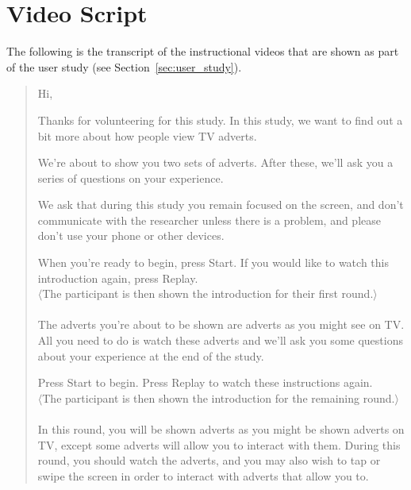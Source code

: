 \section{Video Script}
\label{sec:appendix_video_script}

The following is the transcript of the instructional videos that are shown as part of the user study (see Section~\ref{sec:user_study}).

\begin{quotation}
	\noindent Hi,

	Thanks for volunteering for this study. In this study, we want to find out a bit more about how people view TV adverts. 

	We're about to show you two sets of adverts. After these, we'll ask you a series of questions on your experience.

	We ask that during this study you remain focused on the screen, and don’t communicate with the researcher unless there is a problem, and please don’t use your phone or other devices.

	When you're ready to begin, press Start. If you would like to watch this introduction again, press Replay.\\

	\noindent $\langle$The participant is then shown the introduction for their first round.$\rangle$\\

	\\

	\noindent The adverts you're about to be shown are adverts as you might see on TV. All you need to do is watch these adverts and we'll ask you some questions about your experience at the end of the study.

	Press Start to begin. Press Replay to watch these instructions again.\\
	
	\noindent $\langle$The participant is then shown the introduction for the remaining round.$\rangle$\\

	\\

	In this round, you will be shown adverts as you might be shown adverts on TV, except some adverts will allow you to interact with them. During this round, you should watch the adverts, and you may also wish to tap or swipe the screen in order to interact with adverts that allow you to. 


\end{quotation}
